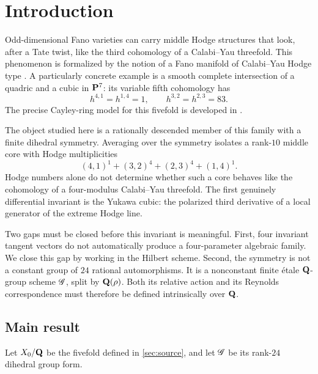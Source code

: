 \section{Introduction}
\label{sec:introduction}

Odd-dimensional Fano varieties can carry middle Hodge structures that look,
after a Tate twist, like the third cohomology of a Calabi--Yau threefold.
This phenomenon is formalized by the notion of a Fano manifold of
Calabi--Yau Hodge type \cite{IlievManivel2015}.  A particularly concrete
example is a smooth complete intersection of a quadric and a cubic in
\(\mathbf P^7\): its variable fifth cohomology has
\[
 h^{4,1}=h^{1,4}=1,\qquad h^{3,2}=h^{2,3}=83.
\]
The precise Cayley-ring model for this fivefold is developed in
\cite[\S5]{FaveroIlievKatzarkov2014}.

The object studied here is a rationally descended member of this family with
a finite dihedral symmetry.  Averaging over the symmetry isolates a
rank-\(10\) middle core with Hodge multiplicities
\[
 (4,1)^1+(3,2)^4+(2,3)^4+(1,4)^1.                 \tag{1.1}
\]
Hodge numbers alone do not determine whether such a core behaves like the
cohomology of a four-modulus Calabi--Yau threefold.  The first genuinely
differential invariant is the Yukawa cubic: the polarized third derivative
of a local generator of the extreme Hodge line.

Two gaps must be closed before this invariant is meaningful.  First, four
invariant tangent vectors do not automatically produce a four-parameter
algebraic family.  We close this gap by working in the Hilbert scheme.
Second, the symmetry is not a constant group of \(24\) rational
automorphisms.  It is a nonconstant finite \'etale \(\mathbf Q\)-group scheme
\(\mathscr G\), split by \(\mathbf Q(\rho)\).  Both its relative action and its
Reynolds correspondence must therefore be defined intrinsically over
\(\mathbf Q\).

\subsection{Main result}

Let \(X_0/\mathbf Q\) be the fivefold defined in \cref{sec:source}, and let
\(\mathscr G\) be its rank-\(24\) dihedral group form.

